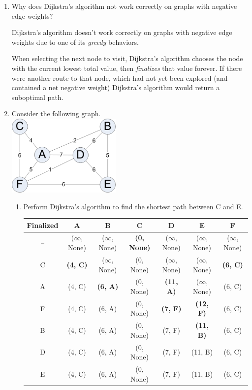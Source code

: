 \documentclass[11pt]{article}
\newenvironment{answer}{\large\lstset{basicstyle=\tiny\ttfamily}\color{white} }{}
\newenvironment{answer}{\large\lstset{basicstyle=\large\ttfamily}\color{red} }{}
\newcommand{\answerrow}[1]{\hline \rowfont{\color{white}} #1}
\newcommand{\answerrow}[1]{\hline \rowfont{\color{red}} #1}
\begin{document}
\begin{enumerate}
\item Why does Dijkstra's algorithm not work correctly on graphs with negative
      edge weights?

\begin{answer}
Dijkstra's algorithm doesn't work correctly on graphs with negative edge
weights due to one of its {\em greedy} behaviors.

When selecting the next node to visit, Dijkstra's algorithm chooses the
node with the current lowest total value, then {\em finalizes} that value
forever. If there were another route to that node, which had not yet been
explored (and contained a net negative weight) Dijkstra's algorithm would
return a suboptimal path.
\end{answer}


\vspace{24pt}
\item
Consider the following graph. \\
\includegraphics[height=150px]{graph}
\begin{enumerate}
\item
Perform Dijkstra's algorithm to find the shortest path between C and E. \\
\def\arraystretch{1.65}
\begin{tabu}{| c | c | c | c | c | c | c |}
\hline
Finalized & A & B & C & D & E & F\\
\hline
-- & ($\infty$, None) & ($\infty$, None) & \textbf{(0, None)} & ($\infty$, None) & ($\infty$, None) & ($\infty$, None) \\
\answerrow{C & \textbf{(4, C)} & ($\infty$, None) & (0, None) & ($\infty$, None) & ($\infty$, None) & \textbf{(6, C)}} \\
\answerrow{A & (4, C) & \textbf{(6, A)} & (0, None) & \textbf{(11, A)} & ($\infty$, None) & (6, C)} \\
\answerrow{F & (4, C) & (6, A) & (0, None) & \textbf{(7, F)} & \textbf{(12, F)} & (6, C)} \\
\answerrow{B & (4, C) & (6, A) & (0, None) & (7, F) & \textbf{(11, B)} & (6, C)} \\
\answerrow{D & (4, C) & (6, A) & (0, None) & (7, F) & (11, B) & (6, C)} \\
\answerrow{E & (4, C) & (6, A) & (0, None) & (7, F) & (11, B) & (6, C)} \\
\hline
\end{tabu} \\


\end{enumerate}
\end{enumerate}
\end{document}
